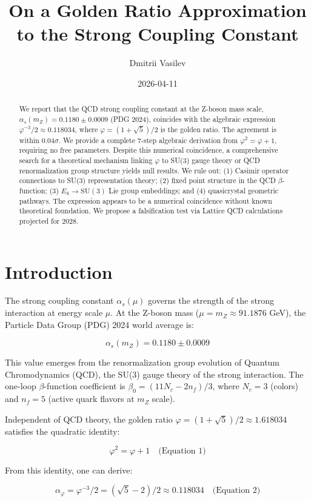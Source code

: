 \documentclass{article}
\title{On a Golden Ratio Approximation to the Strong Coupling Constant}
\author{Dmitrii Vasilev}
\affiliation{Independent Researcher}
\date{2026-04-11}
\begin{document}
\maketitle

\begin{abstract}
We report that the QCD strong coupling constant at the Z-boson mass scale, $\alpha_s(m_Z) = 0.1180 \pm 0.0009$ (PDG 2024), coincides with the algebraic expression $\varphi^{-3}/2 \approx 0.118034$, where $\varphi = (1+\sqrt{5})/2$ is the golden ratio. The agreement is within 0.04$\sigma$. We provide a complete 7-step algebraic derivation from $\varphi^2 = \varphi + 1$, requiring no free parameters. Despite this numerical coincidence, a comprehensive search for a theoretical mechanism linking $\varphi$ to SU(3) gauge theory or QCD renormalization group structure yields null results. We rule out: (1) Casimir operator connections to SU(3) representation theory; (2) fixed point structure in the QCD $\beta$-function; (3) $E_8 \to \mathrm{SU}(3)$ Lie group embeddings; and (4) quasicrystal geometric pathways. The expression appears to be a numerical coincidence without known theoretical foundation. We propose a falsification test via Lattice QCD calculations projected for 2028.
\end{abstract}

\section{Introduction}

The strong coupling constant $\alpha_s(\mu)$ governs the strength of the strong interaction at energy scale $\mu$. At the Z-boson mass ($\mu = m_Z \approx 91.1876$ GeV), the Particle Data Group (PDG) 2024 world average is:

\[
\alpha_s(m_Z) = 0.1180 \pm 0.0009
\]

This value emerges from the renormalization group evolution of Quantum Chromodynamics (QCD), the SU(3) gauge theory of the strong interaction. The one-loop $\beta$-function coefficient is $\beta_0 = (11N_c - 2n_f)/3$, where $N_c = 3$ (colors) and $n_f = 5$ (active quark flavors at $m_Z$ scale).

Independent of QCD theory, the golden ratio $\varphi = (1+\sqrt{5})/2 \approx 1.618034$ satisfies the quadratic identity:

\[
\varphi^2 = \varphi + 1 \quad \text{(Equation 1)}
\]

From this identity, one can derive:

\[
\alpha_\varphi = \varphi^{-3}/2 = (\sqrt{5} - 2)/2 \approx 0.118034 \quad \text{(Equation 2)}
\]
\end{document}
